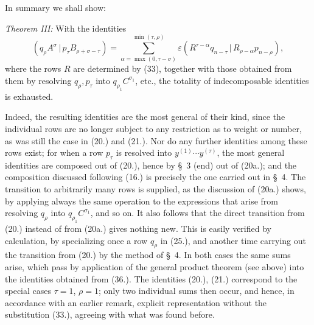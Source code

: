 \documentclass[11pt]{article}
\providecommand{\pair}[2]{(#1\,|\,#2)}
\providecommand{\eps}{\varepsilon}
\begin{document}
In summary we shall show:

\emph{Theorem III:} With the identities
\begin{equation}
 \pair{q_\rho A^\sigma}{p_\tau B_{\rho+\sigma-\tau}}
 =\sum_{\alpha=\max(0,\tau-\sigma)}^{\min(\tau,\rho)}
 \eps\pair{R^{\tau-\alpha}q_{n-\tau}}{R_{\rho-\alpha}p_{n-\rho}},
\tag{36}
\end{equation}
where the rows $R$ are determined by (33), together with those obtained from them by resolving $q_\rho,p_\tau$ into $q_{\rho_1}C^{\sigma_1}$, etc., the totality of indecomposable identities is exhausted.

Indeed, the resulting identities are the most general of their kind, since the individual rows are no longer subject to any restriction as to weight or number, as was still the case in (20.) and (21.). Nor do any further identities among these rows exist; for when a row $p_\tau$ is resolved into $y^{(1)}\cdots y^{(\tau)}$, the most general identities are composed out of (20.), hence by \S\ 3 (end) out of (20a.); and the composition discussed following (16.) is precisely the one carried out in \S\ 4. The transition to arbitrarily many rows is supplied, as the discussion of (20a.) shows, by applying always the same operation to the expressions that arise from resolving $q_\rho$ into $q_{\rho_1}C^{\sigma_1}$, and so on. It also follows that the direct transition from (20.) instead of from (20a.) gives nothing new. This is easily verified by calculation, by specializing once a row $q_\rho$ in (25.), and another time carrying out the transition from (20.) by the method of \S\ 4. In both cases the same sums arise, which pass by application of the general product theorem (see above) into the identities obtained from (36.). The identities (20.), (21.) correspond to the special cases $\tau=1$, $\rho=1$; only two individual sums then occur, and hence, in accordance with an earlier remark, explicit representation without the substitution (33.), agreeing with what was found before.
\end{document}
